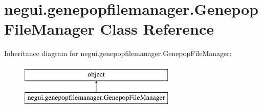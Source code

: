 \hypertarget{classnegui_1_1genepopfilemanager_1_1GenepopFileManager}{}\section{negui.\+genepopfilemanager.\+Genepop\+File\+Manager Class Reference}
\label{classnegui_1_1genepopfilemanager_1_1GenepopFileManager}
Inheritance diagram for negui.\+genepopfilemanager.\+Genepop\+File\+Manager\+:\begin{figure}[H]
\begin{center}
\leavevmode
\includegraphics[height=2.000000cm]{classnegui_1_1genepopfilemanager_1_1GenepopFileManager}
\end{center}
\end{figure}
